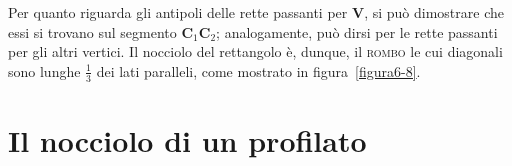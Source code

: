 Per quanto riguarda gli antipoli delle rette passanti per $\mathbf{V}$, si può dimostrare che essi si trovano sul segmento $\mathbf{C}_{1}\mathbf{C}_{2}$; analogamente, può dirsi per le rette passanti per gli altri vertici. Il nocciolo del rettangolo è, dunque, il \textsc{rombo} le cui diagonali sono lunghe $\frac{1}{3}$ dei lati paralleli, come mostrato in figura~\ref{figura6-8}.
\section{Il nocciolo di un profilato}
\renewcommand{\thefigure}{6~-~9}
